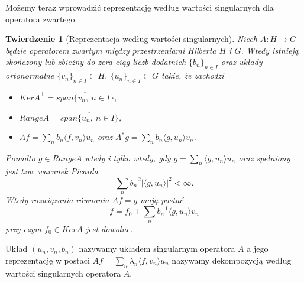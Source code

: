 \documentclass[man,mfiu]{mgrwms}
\newtheorem{tw}{Twierdzenie}[chapter]
\begin{document}
Możemy teraz wprowadzić reprezentację według wartości singularnych dla operatora zwartego.

\begin{tw}[Reprezentacja według wartości singularnych]
Niech $A\colon H\to G$ będzie operatorem zwartym między przestrzeniami Hilberta $H$ i $G$. Wtedy istnieją skończony lub zbieżny do zera ciąg liczb dodatnich $\{b_n\}_{n\in I}$ oraz układy ortonormalne $\{v_n\}_{n\in I}\subset H,\ \{u_n\}_{n\in I}\subset G$ takie, że zachodzi
\begin{itemize}
\vspace{2mm}
\item $KerA^{\perp}=\overline{span\{v_n,\ n\in I\}}$,
\vspace{2mm}
\item $\overline{RangeA}=\overline{span\{u_n,\ n\in I\}}$,
\vspace{2mm}
\item $Af=\sum_nb_n\langle f, v_n\rangle u_n$ oraz $A^*g=\sum_nb_n\langle g, u_n\rangle v_n$.
\vspace{2mm}
\end{itemize}
Ponadto $g\in RangeA$ wtedy i tylko wtedy, gdy $g=\sum_n\langle g, u_n\rangle u_n$ oraz spełniony jest tzw. warunek Picarda
\begin{displaymath} 
\sum_nb_n^{-2}|\langle g, u_n\rangle|^2< \infty .
\end{displaymath}
Wtedy rozwiązania równania $Af=g$ mają postać 
\begin{displaymath}
f=f_0+\sum_nb_n^{-1}\langle g, u_n\rangle v_n
\end{displaymath}
przy czym $f_0\in KerA$ jest dowolne.
\end{tw}
Układ $(u_n,v_n,b_n)$ nazywamy układem singularnym operatora $A$ a jego reprezentację w postaci $Af=\sum_n\lambda_n\langle f,v_n\rangle u_n$ nazywamy dekompozycją według wartości singularnych operatora $A$.
\end{document}

